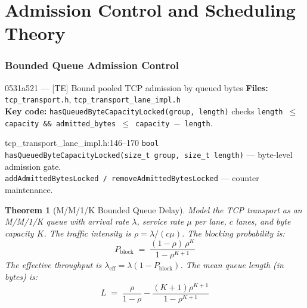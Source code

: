 \documentclass[11pt,a4paper,twoside]{article}
\theoremstyle{plain}
\newtheorem{theorem}{Theorem}[section]
\theoremstyle{definition}
\theoremstyle{remark}
\begin{document}

\part{Admission Control and Scheduling Theory}

\section{Bounded Queue Admission Control}
\label{sec:admission}

\begin{commitbox}{0531a521 --- [TE] Bound pooled TCP admission by queued bytes}
\textbf{Files:} \texttt{tcp\_transport.h}, \texttt{tcp\_transport\_lane\_impl.h}\\
\textbf{Key code:} \texttt{hasQueuedByteCapacityLocked(group, length)} checks
\texttt{length $\leq$ capacity \&\& admitted\_bytes $\leq$ capacity $-$ length}.
\end{commitbox}

\begin{codeline}{tcp\_transport\_lane\_impl.h:146--170}
\texttt{bool hasQueuedByteCapacityLocked(size\_t group, size\_t length)} ---
byte-level admission gate.\\
\texttt{addAdmittedBytesLocked / removeAdmittedBytesLocked} --- counter maintenance.
\end{codeline}

\begin{theorem}[M/M/1/K Bounded Queue Delay]
\label{thm:mm1k}
Model the TCP transport as an M/M/1/K queue with arrival rate $\lambda$,
service rate $\mu$ per lane, $c$ lanes, and byte capacity $K$.
The traffic intensity is $\rho = \lambda / (c\mu)$.  The blocking probability is:
\begin{equation}
  P_{\text{block}} \;=\;
  \frac{(1-\rho)\,\rho^K}{1-\rho^{K+1}}
  \label{eq:blocking-prob}
\end{equation}
The effective throughput is $\lambda_{\text{eff}} = \lambda(1 - P_{\text{block}})$.
The mean queue length (in bytes) is:
\begin{equation}
  L \;=\; \frac{\rho}{1-\rho} - \frac{(K+1)\rho^{K+1}}{1-\rho^{K+1}}
\end{equation}
\end{theorem}
\end{document}

